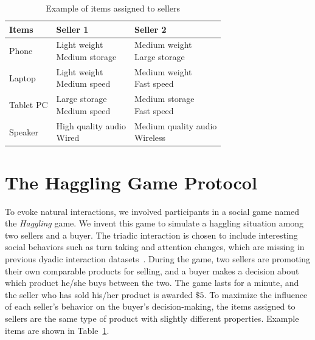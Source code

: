 \begin{table}[h]
	\centering
	
	\begin{tabular}{ l| l | l  }
		\hline	
		Items & Seller 1  &  Seller 2\\
		\hline	
		\hline	
		Phone &  \makecell{Light weight \\ Medium storage}    & \makecell{Medium weight\\ Large storage}\\
		\hline			
		Laptop &  \makecell{Light weight \\ Medium speed}    & \makecell{Medium weight\\ Fast speed}\\
		\hline			
		Tablet PC &  \makecell{Large storage\\ Medium speed}    & \makecell{Medium storage\\ Fast speed}\\
		\hline	
		Speaker &  \makecell{High quality audio\\ Wired}    & \makecell{Medium quality audio\\ Wireless}\\
		\hline	
	\end{tabular}
	\caption{Example of items assigned to sellers}
	\label{table:haggling_items}
\end{table}


\section{The Haggling Game Protocol}
To evoke natural interactions, we involved participants in a social game named the \emph{Haggling} game. We invent this game to simulate a haggling situation among two sellers and a buyer. The triadic interaction is chosen to include interesting social behaviors such as turn taking and attention changes, which are missing in previous dyadic interaction datasets~\cite{rehg2013decoding}. During the game, two sellers are promoting their own comparable products for selling, and a buyer makes a decision about which product he/she buys between the two. The game lasts for a minute, and the seller who has sold his/her product is awarded $\$5$. To maximize the influence of each seller's behavior on the buyer's decision-making, the items assigned to sellers are the same type of product with slightly different properties. Example items are shown in Table~\ref{table:haggling_items}. 

